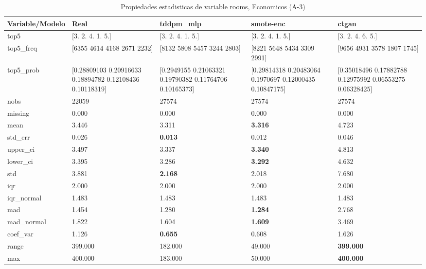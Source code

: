 \begin{table}[H]
\centering
\fontsize{8}{14}\selectfont
\caption{Propiedades  estadisticas de variable rooms, Economicos (A-3)}
\label{table-stats-economicos-a-3-rooms}
\begin{tabular}{|l|m{10em}|m{10em}|m{10em}|m{10em}|}
\hline
 \rowcolor[gray]{0.8}
Variable/Modelo & Real & tddpm\_mlp & smote-enc & ctgan \\
\hline top5 & [3. 2. 4. 1. 5.] & [3. 2. 4. 1. 5.] & [3. 2. 4. 1. 5.] & [3. 2. 4. 6. 5.] \\
\hline top5\_freq & [6355 4614 4168 2671 2232] & [8132 5808 5457 3244 2803] & [8221 5648 5434 3309 2991] & [9656 4931 3578 1807 1745] \\
\hline top5\_prob & [0.28809103 0.20916633 0.18894782 0.12108436 0.10118319] & [0.2949155  0.21063321 0.19790382 0.11764706 0.10165373] & [0.29814318 0.20483064 0.1970697  0.12000435 0.10847175] & [0.35018496 0.17882788 0.12975992 0.06553275 0.06328425] \\
\hline nobs & 22059 & 27574 & 27574 & 27574 \\
\hline missing & 0.000 & 0.000 & 0.000 & 0.000 \\
\hline mean & 3.446 & 3.311 & \bfseries 3.316 & \cellcolor[rgb]{0.9, 0.54, 0.52} 4.723 \\
\hline std\_err & 0.026 & \bfseries 0.013 & 0.012 & \cellcolor[rgb]{0.9, 0.54, 0.52} 0.046 \\
\hline upper\_ci & 3.497 & 3.337 & \bfseries 3.340 & \cellcolor[rgb]{0.9, 0.54, 0.52} 4.813 \\
\hline lower\_ci & 3.395 & 3.286 & \bfseries 3.292 & \cellcolor[rgb]{0.9, 0.54, 0.52} 4.632 \\
\hline std & 3.881 & \bfseries 2.168 & 2.018 & \cellcolor[rgb]{0.9, 0.54, 0.52} 7.680 \\
\hline iqr & 2.000 & 2.000 & 2.000 & 2.000 \\
\hline iqr\_normal & 1.483 & 1.483 & 1.483 & 1.483 \\
\hline mad & 1.454 & 1.280 & \bfseries 1.284 & \cellcolor[rgb]{0.9, 0.54, 0.52} 2.768 \\
\hline mad\_normal & 1.822 & 1.604 & \bfseries 1.609 & \cellcolor[rgb]{0.9, 0.54, 0.52} 3.469 \\
\hline coef\_var & 1.126 & \bfseries 0.655 & \cellcolor[rgb]{0.9, 0.54, 0.52} 0.608 & 1.626 \\
\hline range & 399.000 & 182.000 & \cellcolor[rgb]{0.9, 0.54, 0.52} 49.000 & \bfseries 399.000 \\
\hline max & 400.000 & 183.000 & \cellcolor[rgb]{0.9, 0.54, 0.52} 50.000 & \bfseries 400.000 \\

\end{tabular}
\end{table}
